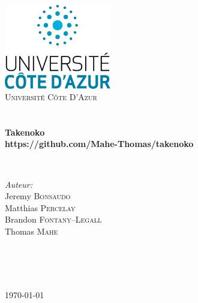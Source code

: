 \begin{titlepage}
\begin{center}

\includegraphics[width=0.35\textwidth]{./assets/logo}~\\[1cm]

\textsc{\LARGE Université Côte D'Azur}\\[1.5cm]

\textsc{\Large }\\[0.5cm]

\HRule \\[0.4cm]

{\huge \bfseries Takenoko\\
https://github.com/Mahe-Thomas/takenoko \\[0.4cm] }

\HRule \\[1.5cm]

\begin{minipage}{0.4\textwidth}
\begin{flushleft} \large
\emph{Auteur:}\\
Jeremy \textsc{Bonsaudo}\\
Matthias \textsc{Percelay}\\
Brandon \textsc{Fontany--Legall}\\
Thomas \textsc{Mahe}
\end{flushleft}
\end{minipage}
\begin{minipage}{0.4\textwidth}
\begin{flushright} \large
\emph{} \\
 \textsc{}\\
\emph{} \\
 \textsc{}
\end{flushright}
\end{minipage}

\vfill

{\large \today}

\end{center}
\end{titlepage}